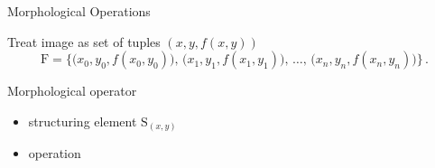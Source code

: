 \begin{frame}{Morphological Operations}
    \begin{block}{Treat image as set of tuples $(x,y,f(x,y))$}
        \begin{equation*}
            \mathrm{F} = \Big\lbrace\big(x_0, y_0, f(x_0, y_0)\big),\, \big(x_1, y_1, f(x_1,
            y_1)\big),\, \ldots,\, \big(x_n,
            y_n, f(x_n, y_n)\big)\Big\rbrace\,.
        \end{equation*}
    \end{block}
    \begin{block}{Morphological operator}
        \begin{itemize}
            \item structuring element $\mathrm{S}_{(x,y)}$
            \item operation
        \end{itemize}
    \end{block}
\end{frame}

